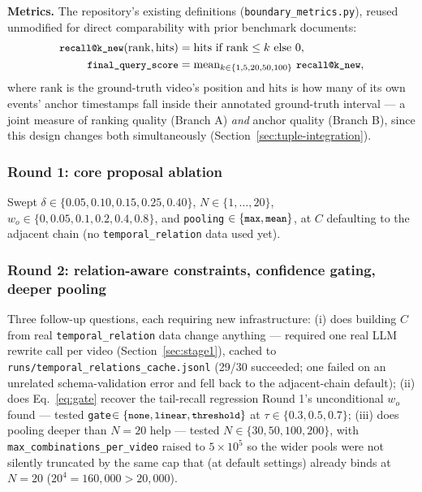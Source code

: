 \documentclass[11pt]{article}
\newcommand{\code}[1]{\texttt{\small #1}}
\newcommand{\file}[1]{\texttt{\footnotesize #1}}
\begin{document}
\textbf{Metrics.} The repository's existing definitions
(\file{boundary\_metrics.py}), reused unmodified for direct comparability
with prior benchmark documents:
\begin{align}
  \code{recall@k\_new}(\mathrm{rank}, \mathrm{hits}) &= \mathrm{hits}\ \text{if}\ \mathrm{rank}\le k\ \text{else}\ 0,\\
  \code{final\_query\_score} &= \mathrm{mean}_{k \in \{1,5,20,50,100\}}\ \code{recall@k\_new},
\end{align}
where $\mathrm{rank}$ is the ground-truth video's position and
$\mathrm{hits}$ is how many of its own events' anchor timestamps fall
inside their annotated ground-truth interval --- a joint measure of ranking
quality (Branch A) \emph{and} anchor quality (Branch B), since this design
changes both simultaneously (Section~\ref{sec:tuple-integration}).

\subsubsection{Round 1: core proposal ablation}
\label{sec:tuple-round1}
Swept $\delta \in \{0.05, 0.10, 0.15, 0.25, 0.40\}$, $N \in \{1,\dots,20\}$,
$w_o \in \{0, 0.05, 0.1, 0.2, 0.4, 0.8\}$, and \code{pooling}
$\in\{\code{max},\code{mean}\}$, at $C$ defaulting to the adjacent chain
(no \code{temporal\_relation} data used yet).

\subsubsection{Round 2: relation-aware constraints, confidence gating, deeper pooling}
\label{sec:tuple-round2}
Three follow-up questions, each requiring new infrastructure: (i) does
building $C$ from real \code{temporal\_relation} data change anything ---
required one real LLM rewrite call per video (Section~\ref{sec:stage1}),
cached to \file{runs/temporal\_relations\_cache.jsonl} (29/30 succeeded; one
failed on an unrelated schema-validation error and fell back to the
adjacent-chain default); (ii) does Eq.~\ref{eq:gate} recover the tail-recall
regression Round 1's unconditional $w_o$ found --- tested
\code{gate}$\in\{\code{none},\code{linear},\code{threshold}\}$ at
$\tau\in\{0.3,0.5,0.7\}$; (iii) does pooling deeper than $N=20$ help ---
tested $N\in\{30,50,100,200\}$, with \code{max\_combinations\_per\_video}
raised to $5{\times}10^5$ so the wider pools were not silently truncated by
the same cap that (at default settings) already binds at $N{=}20$
($20^4=160{,}000 > 20{,}000$).
\end{document}
